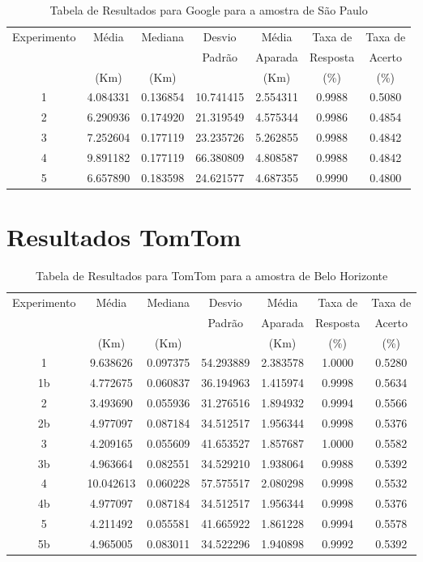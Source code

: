 \begin{anexosenv}
\begin{table}[ht]
\centering
\begin{tabular}{|c|c|c|c|c|c|c|}
\hline
Experimento & Média & Mediana & Desvio & Média & Taxa de & Taxa de \\
    & & & Padrão & Aparada & Resposta & Acerto \\
    & (Km) & (Km) & & (Km) & (\%) & (\%) \\ \hline
1 & 4.084331 & 0.136854 & 10.741415 & 2.554311 & 0.9988 & 0.5080 \\ \hline
2 & 6.290936 & 0.174920 & 21.319549 & 4.575344 & 0.9986 & 0.4854 \\ \hline
3 & 7.252604 & 0.177119 & 23.235726 & 5.262855 & 0.9988 & 0.4842 \\ \hline
4 & 9.891182 & 0.177119 & 66.380809 & 4.808587 & 0.9988 & 0.4842 \\ \hline
5 & 6.657890 & 0.183598 & 24.621577 & 4.687355 & 0.9990 & 0.4800 \\ \hline
\end{tabular}
\caption{Tabela de Resultados para Google para a amostra de São Paulo}
\label{tab:googleSP}
\end{table}
    

\section{Resultados TomTom}

\begin{table}[ht]
\centering
\begin{tabular}{|c|c|c|c|c|c|c|}
\hline
Experimento & Média & Mediana & Desvio & Média & Taxa de & Taxa de \\
 & & & Padrão & Aparada & Resposta & Acerto \\
 & (Km) & (Km) & & (Km) & (\%) & (\%) \\ \hline
1 & 9.638626 & 0.097375 & 54.293889 & 2.383578 & 1.0000 & 0.5280 \\ \hline
1b & 4.772675 & 0.060837 & 36.194963 & 1.415974 & 0.9998 & 0.5634 \\ \hline
2 & 3.493690 & 0.055936 & 31.276516 & 1.894932 & 0.9994 & 0.5566 \\ \hline
2b & 4.977097 & 0.087184 & 34.512517 & 1.956344 & 0.9998 & 0.5376 \\ \hline
3 & 4.209165 & 0.055609 & 41.653527 & 1.857687 & 1.0000 & 0.5582 \\ \hline
3b & 4.963664 & 0.082551 & 34.529210 & 1.938064 & 0.9988 & 0.5392 \\ \hline
4 & 10.042613 & 0.060228 & 57.575517 & 2.080298 & 0.9998 & 0.5532 \\ \hline
4b & 4.977097 & 0.087184 & 34.512517 & 1.956344 & 0.9998 & 0.5376 \\ \hline
5 & 4.211492 & 0.055581 & 41.665922 & 1.861228 & 0.9994 & 0.5578 \\ \hline
5b & 4.965005 & 0.083011 & 34.522296 & 1.940898 & 0.9992 & 0.5392 \\ \hline
\end{tabular}
\caption{Tabela de Resultados para TomTom para a amostra de Belo Horizonte}
\label{tab:tomtomBH}
\end{table}





\end{anexosenv}
